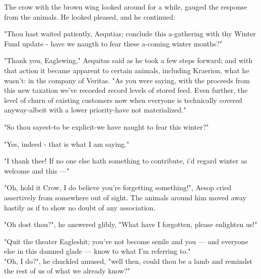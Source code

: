 The crow with the brown wing looked around for a while, gauged the response from the animals. He looked pleased, and he continued:

"Thou hast waited patiently, Aequtias; conclude this a-gathering with thy Winter Fund update - have we naugth to fear these a-coming winter months?"

"Thank you, Eaglewing," Aequitas said as he took a few steps forward; and with that action it became apparent to certain animals, including Kraerion, what he wasn't: in the company of Veritas. "As you were saying, with the proceeds from this new taxation we've recorded record levels of stored feed. Even further, the level of churn of existing customers now when everyone is technically covered anyway-albeit with a lower priority-have not materialized."

"So thou sayest-to be explicit-we have naught to fear this winter?"

"Yes, indeed - that is what I am saying."

"I thank thee! If no one else hath something to contribute, i'd regard winter as welcome and this —"

"Oh, hold it Crow, I do believe you're forgetting something!", Aesop cried assertively from somewhere out of sight. The animals around him moved away hastily as if to show no doubt of any association.

"Oh dost thou?", he answered glibly, "What have I forgotten, please enlighten us!"


"Quit the theater Eagleshit; you've not become senile and you — and everyone else in this damned glade — know to what I'm referring to."\\


"Oh, I do?", he chuckled amused, "well then, could thou be a lamb and remindst the rest of us of what we already know?"

